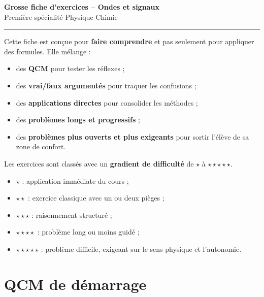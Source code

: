 \documentclass[11pt,a4paper]{article}
\begin{document}
\begin{center}
    {\LARGE\bfseries Grosse fiche d'exercices -- Ondes et signaux}\\[0.3em]
    {\large Première spécialité Physique-Chimie}\\[0.4em]
    \rule{0.92\linewidth}{0.6pt}
\end{center}

\begin{objectifbox}
Cette fiche est conçue pour \textbf{faire comprendre} et pas seulement pour appliquer des formules. Elle mélange :
\begin{itemize}[leftmargin=1.2em]
    \item des \textbf{QCM} pour tester les réflexes ;
    \item des \textbf{vrai/faux argumentés} pour traquer les confusions ;
    \item des \textbf{applications directes} pour consolider les méthodes ;
    \item des \textbf{problèmes longs et progressifs} ;
    \item des \textbf{problèmes plus ouverts et plus exigeants} pour sortir l'élève de sa zone de confort.
\end{itemize}
Les exercices sont classés avec un \textbf{gradient de difficulté} de $\star$ à $\star\star\star\star\star$.
\end{objectifbox}

\begin{baremebox}
\begin{itemize}[leftmargin=1.2em]
    \item $\star$ : application immédiate du cours ;
    \item $\star\star$ : exercice classique avec un ou deux pièges ;
    \item $\star\star\star$ : raisonnement structuré ;
    \item $\star\star\star\star$ : problème long ou moins guidé ;
    \item $\star\star\star\star\star$ : problème difficile, exigeant sur le sens physique et l'autonomie.
\end{itemize}
\end{baremebox}

\tableofcontents
\bigskip

\section{QCM de démarrage}
\end{document}
